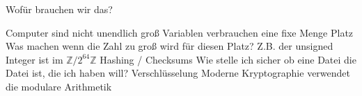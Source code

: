 \begin{frame}{Wofür brauchen wir das?}
    \begin{outline}
        \1 Computer sind nicht unendlich groß
            \2 Variablen verbrauchen eine fixe Menge Platz
            \2 Was machen wenn die Zahl zu groß wird für diesen Platz?
            \2 Z.B. der unsigned Integer ist im $\mathbb Z / 2^{64}\mathbb Z$
            \pause
        \1 Hashing / Checksums
            \2 Wie stelle ich sicher ob eine Datei die Datei ist, die ich haben will?
            \pause
        \1 Verschlüsselung
            \2 Moderne Kryptographie verwendet die modulare Arithmetik 

    \end{outline}
\end{frame}